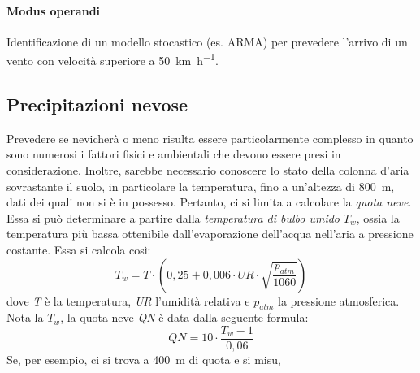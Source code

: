 \paragraph{Modus operandi} Identificazione di un modello stocastico (es. ARMA) per prevedere l'arrivo di un vento con velocità superiore a \SI[per-mode=symbol-or-fraction]{50}{\kilo\meter\per\hour}. 

\subsection{Precipitazioni nevose}
Prevedere se nevicherà o meno risulta essere particolarmente complesso in quanto sono numerosi i fattori fisici e ambientali che devono essere presi in considerazione. Inoltre, sarebbe necessario conoscere lo stato della colonna d'aria sovrastante il suolo, in particolare la temperatura, fino a un'altezza di \SI{800}{\meter}, dati dei quali non si è in possesso. Pertanto, ci si limita a calcolare la \textit{quota neve}. Essa si può determinare a partire dalla \textit{temperatura di bulbo umido} $T_w$, ossia la temperatura più bassa ottenibile dall’evaporazione dell’acqua nell’aria a pressione costante. Essa si calcola così:
\[ T_w = T \cdot (0,25 + 0,006 \cdot UR \cdot \sqrt{\frac{p_{atm}}{1060}})\]
dove \textit{T} è la temperatura, \textit{UR} l'umidità relativa e $p_{atm}$ la pressione atmosferica.
Nota la $T_w$, la quota neve \textit{QN} è data dalla seguente formula:
\[ QN = 10 \cdot \frac{T_w - 1}{0,06}\]
Se, per esempio, ci si trova a \SI{400}{\meter} di quota e si misu, 